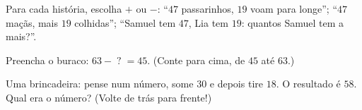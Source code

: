 \begin{exercise}[$\star$]\label{exo:g2:subtraction:8}
Para cada história, escolha $+$ ou $-$: ``$47$ passarinhos, $19$
voam para longe''; ``$47$ maçãs, mais $19$ colhidas''; ``Samuel tem
$47$, Lia tem $19$: quantos Samuel tem a mais?''.
\end{exercise}

\begin{exercise}[$\star$]\label{exo:g2:subtraction:9}
Preencha o buraco: $63 - \;?\; = 45$. (Conte para cima, de $45$ até
$63$.)
\end{exercise}

\begin{exercise}[$\star\star$]\label{exo:g2:subtraction:10}
Uma brincadeira: pense num número, some $30$ e depois tire $18$. O
resultado é $58$. Qual era o número? (Volte de trás para frente!)
\end{exercise}
